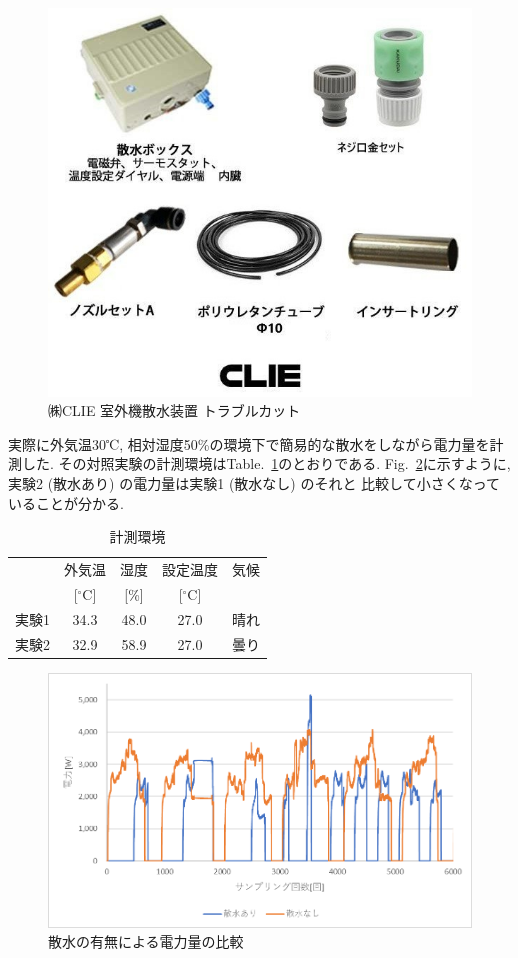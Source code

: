 \documentclass[a4j,fleqn,dvipdfmx,uplatex]{jsarticle}
\newcommand{\figref}[1]{Fig.\ \ref{#1}}
\newcommand{\tableref}[1]{Table.\ \ref{#1}}
\begin{document}
\begin{figure}[htb]
  \centering
  \includegraphics[width=0.8\linewidth]{img/trubleCut.jpg}
  \caption{㈱CLIE 室外機散水装置 トラブルカット}
  \label{fig:truble_cut}
\end{figure}

実際に外気温30℃, 相対湿度50\%の環境下で簡易的な散水をしながら電力量を計測した. 
その対照実験の計測環境は\tableref{table:ex1}のとおりである. 
\figref{fig1:compare_watering}に示すように, 実験2 (散水あり) の電力量は実験1 (散水なし) のそれと
比較して小さくなっていることが分かる.

\begin{table}[htb]
  \caption{計測環境}
  \label{table:ex1}
  \centering
  \begin{tabular}{lcccc}
     & 外気温 & 湿度 & 設定温度 & 気候 \\[-1.5mm]
     & [$^\circ$C] & [\%] & [$^\circ$C] &  \\
    \hline \hline
    実験1 & 34.3 & 48.0 & 27.0 & 晴れ  \\
    実験2 & 32.9 & 58.9 & 27.0 & 曇り \\
    \hline
  \end{tabular}
\end{table}

\begin{figure}[htb]
  \centering
      \includegraphics[width=0.8\linewidth]{img/ex1.png}
      \caption{散水の有無による電力量の比較}
      \label{fig1:compare_watering}
\end{figure}
\end{document}
